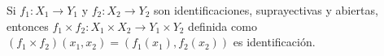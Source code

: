 

\begin{proposition}
Si $f_1 : X_1 \longrightarrow Y_1$ y $f_2 : X_2 \longrightarrow Y_2$ son identificaciones, suprayectivas y abiertas, entonces $f_1 \times f_2 : X_1 \times X_2 \longrightarrow Y_1 \times Y_2$ definida como $(f_1 \times f_2)(x_1, x_2) = (f_1(x_1), f_2(x_2))$ es identificación.
\end{proposition}
